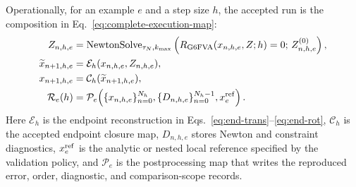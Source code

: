\documentclass[preprint,12pt]{elsarticle}
\begin{document}
Operationally, for an example $e$ and a step size $h$, the accepted run is
the composition in Eq.~\eqref{eq:complete-execution-map}:
\begin{align}
  Z_{n,h,e}
    &=\operatorname{NewtonSolve}_{\tau_N,k_{\max}}
      \left(R_{\mathrm{G6FVA}}(x_{n,h,e},Z;h)=0;\,
      Z^{(0)}_{n,h,e}\right), \notag\\
  \widetilde{x}_{n+1,h,e}
    &=\mathcal E_h(x_{n,h,e},Z_{n,h,e}), \notag\\
  x_{n+1,h,e}
    &=\mathcal C_h(\widetilde{x}_{n+1,h,e}), \notag\\
  \mathcal R_e(h)
    &=\mathcal P_e\!\left(\{x_{n,h,e}\}_{n=0}^{N_h},
      \{D_{n,h,e}\}_{n=0}^{N_h-1},x_e^{\rm ref}\right).
  \label{eq:complete-execution-map}
\end{align}
Here $\mathcal E_h$ is the endpoint reconstruction in
Eqs.~\eqref{eq:end-trans}--\eqref{eq:end-rot}, $\mathcal C_h$ is the
accepted endpoint closure map, $D_{n,h,e}$ stores Newton and constraint
diagnostics, $x_e^{\rm ref}$ is the analytic or nested local reference
specified by the validation policy, and $\mathcal P_e$ is the postprocessing
map that writes the reproduced error, order, diagnostic, and comparison-scope
records.
\end{document}
